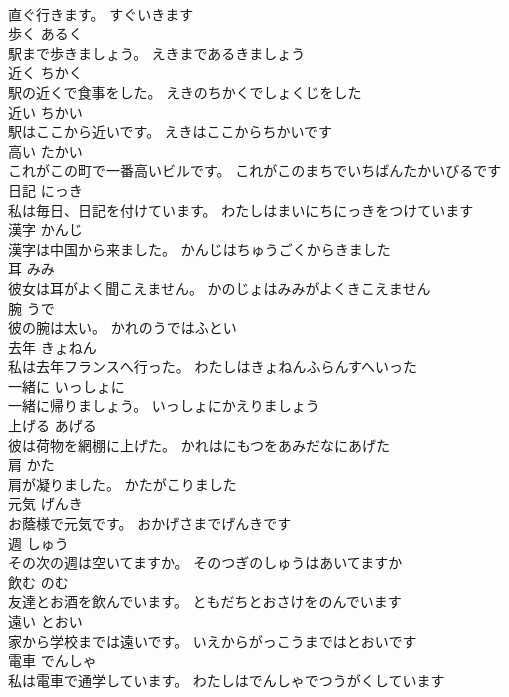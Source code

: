 \documentclass[8pt]{extreport}
\begin{document}
\begin{CJK}{UTF8}{min}
\\	直ぐ行きます。	すぐいきます	
\\	歩く	あるく	
\\	駅まで歩きましょう。	えきまであるきましょう	
\\	近く	ちかく	
\\	駅の近くで食事をした。	えきのちかくでしょくじをした	
\\	近い	ちかい	
\\	駅はここから近いです。	えきはここからちかいです	
\\	高い	たかい	
\\	これがこの町で一番高いビルです。	これがこのまちでいちばんたかいびるです	
\\	日記	にっき	
\\	私は毎日、日記を付けています。	わたしはまいにちにっきをつけています	
\\	漢字	かんじ	
\\	漢字は中国から来ました。	かんじはちゅうごくからきました	
\\	耳	みみ	
\\	彼女は耳がよく聞こえません。	かのじょはみみがよくきこえません	
\\	腕	うで	
\\	彼の腕は太い。	かれのうではふとい	
\\	去年	きょねん	
\\	私は去年フランスへ行った。	わたしはきょねんふらんすへいった	
\\	一緒に	いっしょに	
\\	一緒に帰りましょう。	いっしょにかえりましょう	
\\	上げる	あげる	
\\	彼は荷物を網棚に上げた。	かれはにもつをあみだなにあげた	
\\	肩	かた	
\\	肩が凝りました。	かたがこりました	
\\	元気	げんき	
\\	お蔭様で元気です。	おかげさまでげんきです	
\\	週	しゅう	
\\	その次の週は空いてますか。	そのつぎのしゅうはあいてますか	
\\	飲む	のむ	
\\	友達とお酒を飲んでいます。	ともだちとおさけをのんでいます	
\\	遠い	とおい	
\\	家から学校までは遠いです。	いえからがっこうまではとおいです	
\\	電車	でんしゃ	
\\	私は電車で通学しています。	わたしはでんしゃでつうがくしています	

\end{CJK}
\end{document}
